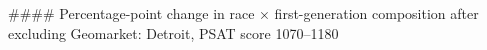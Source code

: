 #### Percentage-point change in race × first-generation composition after excluding Geomarket: Detroit, PSAT score 1070–1180
